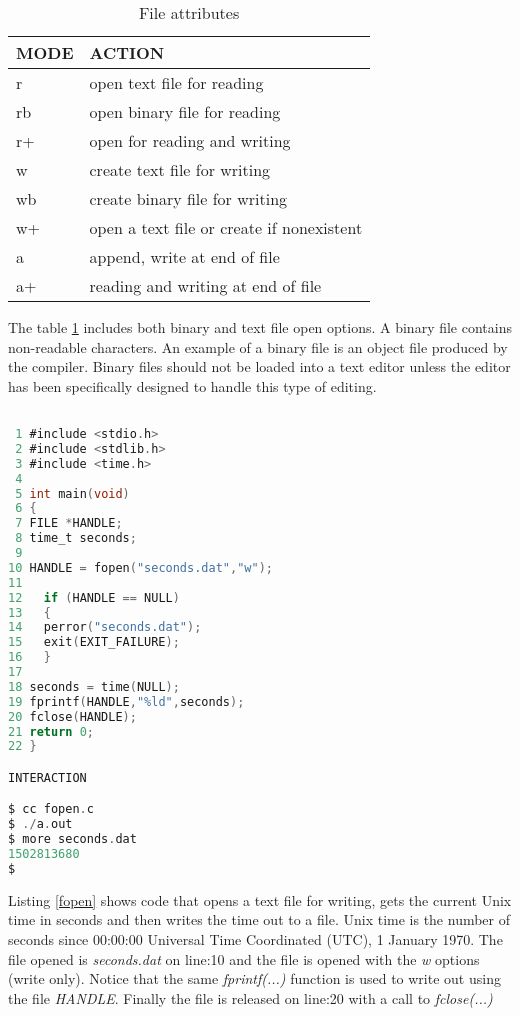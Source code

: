 \begin{table}
\centering
  \begin{tabular}{ | l | l |}
    \hline
    MODE & ACTION \\ \hline
    r & open text file for reading \\ \hline
    rb & open binary file for reading \\ \hline
    r+ & open for reading and writing \\ \hline
    w & create text file for writing \\ \hline
    wb & create binary file for writing \\ \hline
    w+ & open a text file or create if nonexistent \\ \hline
    a & append, write at end of file \\ \hline
    a+ & reading and writing at end of file \\ \hline
  \end{tabular}
\caption{File attributes}
\label{fopenformat}
\end{table}

The table \ref{fopenformat} includes both binary and text file open options. A binary file contains non-readable characters. An example of a binary file is an object file produced by the compiler. Binary files should not be loaded into a text editor unless the editor has been specifically designed to handle this type of editing.

\begin{lstlisting}[language=C,showstringspaces=false,caption={File: fopen.c},captionpos=b,label=fopen]

 1 #include <stdio.h>
 2 #include <stdlib.h>
 3 #include <time.h>
 4 
 5 int main(void)
 6 {
 7 FILE *HANDLE;
 8 time_t seconds;
 9 
10 HANDLE = fopen("seconds.dat","w");
11 
12   if (HANDLE == NULL)
13   {
14   perror("seconds.dat");
15   exit(EXIT_FAILURE);
16   }
17 
18 seconds = time(NULL);
19 fprintf(HANDLE,"%ld",seconds);
20 fclose(HANDLE);
21 return 0;
22 }

INTERACTION

$ cc fopen.c
$ ./a.out
$ more seconds.dat
1502813680
$

\end{lstlisting}

Listing \ref{fopen} shows code that opens a text file for writing, gets the current Unix time in seconds and then writes the time out to a file. Unix time is the number of seconds since 00:00:00 Universal Time Coordinated (UTC), 1 January 1970. The file opened is \textit{seconds.dat} on line:10 and the file is opened with the \textit{w} options (write only). Notice that the same \textit{fprintf(...)} function is used to write out using the file \textit{HANDLE}. Finally the file is released on line:20 with a call to \textit{fclose(...)}

